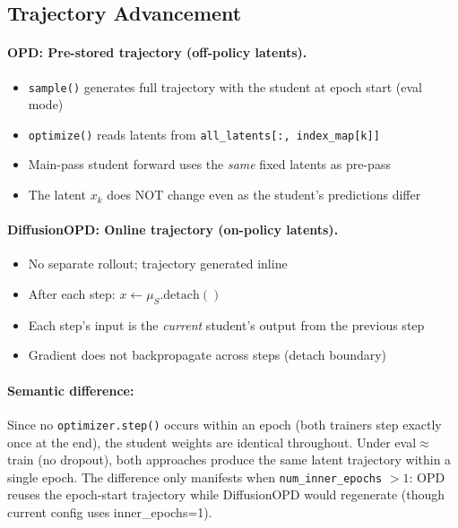 \documentclass[11pt]{article}
\begin{document}
\subsection{Trajectory Advancement}

\paragraph{OPD: Pre-stored trajectory (off-policy latents).}
\begin{itemize}[nosep]
    \item \texttt{sample()} generates full trajectory with the student at epoch start (eval mode)
    \item \texttt{optimize()} reads latents from \texttt{all\_latents[:, index\_map[k]]}
    \item Main-pass student forward uses the \emph{same} fixed latents as pre-pass
    \item The latent $x_k$ does NOT change even as the student's predictions differ
\end{itemize}

\paragraph{DiffusionOPD: Online trajectory (on-policy latents).}
\begin{itemize}[nosep]
    \item No separate rollout; trajectory generated inline
    \item After each step: $x \leftarrow \mu_S.\text{detach}()$
    \item Each step's input is the \emph{current} student's output from the previous step
    \item Gradient does not backpropagate across steps (detach boundary)
\end{itemize}

\paragraph{Semantic difference:}
Since no \texttt{optimizer.step()} occurs within an epoch (both trainers step exactly once at the end), the student weights are identical throughout. Under eval$\approx$train (no dropout), both approaches produce the same latent trajectory within a single epoch. The difference only manifests when \texttt{num\_inner\_epochs} $> 1$: OPD reuses the epoch-start trajectory while DiffusionOPD would regenerate (though current config uses inner\_epochs=1).
\end{document}
